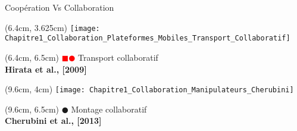 \documentclass[french]{beamer}
\begin{document}
\begin{frame}{Coopération Vs Collaboration}
\begin{textblock*}{3cm}(6.4cm, 3.625cm)
\centering
\texttt{[image: Chapitre1\_Collaboration\_Plateformes\_Mobiles\_Transport\_Collaboratif]}
\end{textblock*}
\begin{textblock*}{3cm}(6.4cm, 6.5cm)
\centering
\tiny{\textcolor{red}{$\blacksquare$}\textcolor{red}{$\CIRCLE$} Transport collaboratif}\\
\tiny{\textbf{Hirata et al., [2009]}}\\
\end{textblock*}

\begin{textblock*}{3.1cm}(9.6cm, 4cm)
\centering
\texttt{[image: Chapitre1\_Collaboration\_Manipulateurs\_Cherubini]}
\end{textblock*}
\begin{textblock*}{3.1cm}(9.6cm, 6.5cm)
\centering
\tiny{\textcolor{vert}{$\CIRCLE$} Montage collaboratif}\\
\tiny{\textbf{Cherubini et al., [2013]}}\\
\end{textblock*}

\end{frame}
\end{document}
